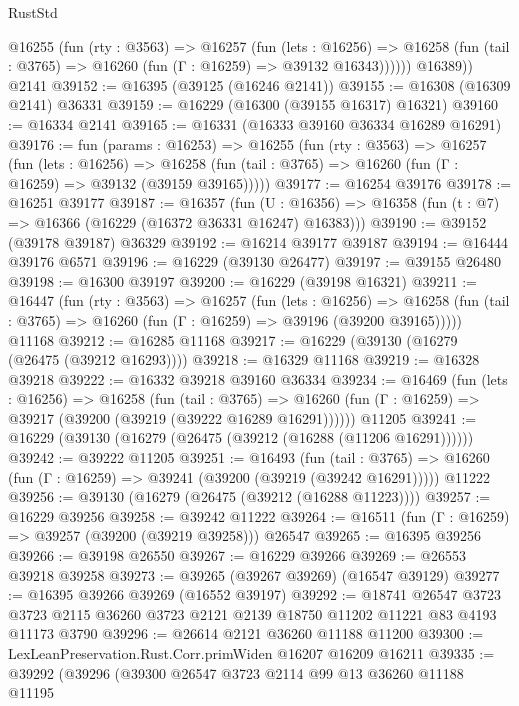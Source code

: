 \begin{lexlean}{RustStd}
\begin{coremodule}
          @16255
            (fun (rty : @3563) =>
            @16257
              (fun (lets : @16256) =>
              @16258 (fun (tail : @3765) => @16260 (fun (Γ : @16259) => @39132 @16343))))))
        @16389))
    @2141
@39152 := @16395 (@39125 (@16246 @2141))
@39155 := @16308 (@16309 @2141) @36331
@39159 := @16229 (@16300 (@39155 @16317) @16321)
@39160 := @16334 @2141
@39165 := @16331 (@16333 @39160 @36334 @16289 @16291)
@39176 := fun (params : @16253) =>
  @16255
    (fun (rty : @3563) =>
    @16257
      (fun (lets : @16256) =>
      @16258 (fun (tail : @3765) => @16260 (fun (Γ : @16259) => @39132 (@39159 @39165)))))
@39177 := @16254 @39176
@39178 := @16251 @39177
@39187 := @16357
    (fun (U : @16356) => @16358 (fun (t : @7) => @16366 (@16229 (@16372 @36331 @16247) @16383)))
@39190 := @39152 (@39178 @39187) @36329
@39192 := @16214 @39177 @39187
@39194 := @16444 @39176 @6571
@39196 := @16229 (@39130 @26477)
@39197 := @39155 @26480
@39198 := @16300 @39197
@39200 := @16229 (@39198 @16321)
@39211 := @16447
    (fun (rty : @3563) =>
    @16257
      (fun (lets : @16256) =>
      @16258 (fun (tail : @3765) => @16260 (fun (Γ : @16259) => @39196 (@39200 @39165)))))
    @11168
@39212 := @16285 @11168
@39217 := @16229 (@39130 (@16279 (@26475 (@39212 @16293))))
@39218 := @16329 @11168
@39219 := @16328 @39218
@39222 := @16332 @39218 @39160 @36334
@39234 := @16469
    (fun (lets : @16256) =>
    @16258
      (fun (tail : @3765) =>
      @16260 (fun (Γ : @16259) => @39217 (@39200 (@39219 (@39222 @16289 @16291))))))
    @11205
@39241 := @16229 (@39130 (@16279 (@26475 (@39212 (@16288 (@11206 @16291))))))
@39242 := @39222 @11205
@39251 := @16493
    (fun (tail : @3765) => @16260 (fun (Γ : @16259) => @39241 (@39200 (@39219 (@39242 @16291)))))
    @11222
@39256 := @39130 (@16279 (@26475 (@39212 (@16288 @11223))))
@39257 := @16229 @39256
@39258 := @39242 @11222
@39264 := @16511 (fun (Γ : @16259) => @39257 (@39200 (@39219 @39258))) @26547
@39265 := @16395 @39256
@39266 := @39198 @26550
@39267 := @16229 @39266
@39269 := @26553 @39218 @39258
@39273 := @39265 (@39267 @39269) (@16547 @39129)
@39277 := @16395 @39266 @39269 (@16552 @39197)
@39292 := @18741
    @26547
    @3723
    @3723
    @2115
    @36260
    @3723
    @2121
    @2139
    @18750
    @11202
    @11221
    @83
    @4193
    @11173
    @3790
@39296 := @26614 @2121 @36260 @11188 @11200
@39300 := LexLeanPreservation.Rust.Corr.primWiden @16207 @16209 @16211
@39335 := @39292
    (@39296
      (@39300
        @26547
        @3723
        @2114
        @99
        @13
        @36260
        @11188
        @11195

\end{coremodule}
\end{lexlean}
